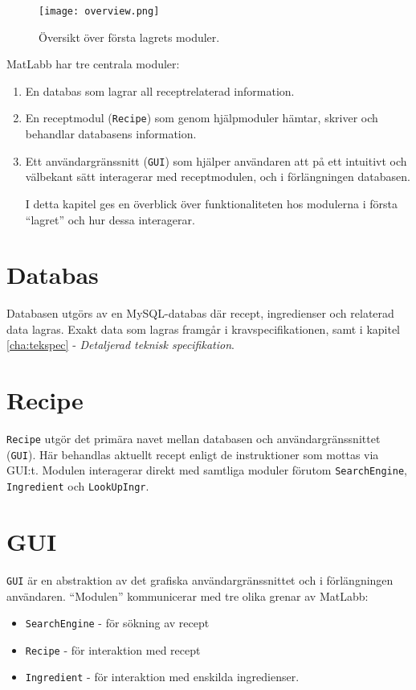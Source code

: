 
\begin{figure}[h]
\centering
\texttt{[image: overview.png]}
\caption{Översikt över första lagrets moduler.}
\label{fig:overview}
\end{figure}

MatLabb har tre centrala moduler: 
\begin{enumerate}
\item En databas som lagrar all receptrelaterad information.
\item En receptmodul (\verb=Recipe=) som genom hjälpmoduler hämtar, skriver och behandlar databasens information.
\item Ett användargränssnitt (\verb=GUI=) som hjälper användaren att på ett intuitivt och välbekant sätt interagerar med receptmodulen, och i förlängningen databasen.

I detta kapitel ges en överblick över funktionaliteten hos modulerna i första ``lagret'' och hur dessa interagerar.
\end{enumerate}

\section{Databas}\label{sec:ark.databas)}
Databasen utgörs av en MySQL-databas där recept, ingredienser och relaterad data lagras. Exakt data som lagras framgår i kravspecifikationen, samt i kapitel \ref{cha:tekspec} - \emph{Detaljerad teknisk specifikation}.

\section{Recipe}\label{sec:ark.recipe}
\verb=Recipe= utgör det primära navet mellan databasen och användargränssnittet (\verb=GUI=). Här behandlas aktuellt recept enligt de instruktioner som mottas via GUI:t. Modulen interagerar direkt med samtliga moduler förutom \verb=SearchEngine=, \verb=Ingredient= och \verb=LookUpIngr=.

\section{GUI}\label{sec:ark.gui}
\verb=GUI= är en abstraktion av det grafiska användargränssnittet och i förlängningen användaren. ``Modulen'' kommunicerar med tre olika grenar av MatLabb:
\begin{itemize}
  \item \verb=SearchEngine= - för sökning av recept
  \item \verb=Recipe= - för interaktion med recept
  \item \verb=Ingredient= - för interaktion med enskilda ingredienser.
\end{itemize}

